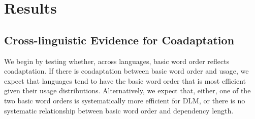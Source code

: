 \documentclass[11pt,a4paper]{article}
\newcommand\mhahn[1]{{\color{red}(#1)}}
\begin{document}
















\section*{Results}

\subsection*{Cross-linguistic Evidence for Coadaptation}

We begin by testing whether, across languages, basic word order reflects coadaptation.
If there is coadaptation between basic word order and usage, we expect that languages tend to have the basic word order that is most efficient given their usage distributions.
Alternatively, we expect that, either, one of the two basic word orders is systematically more efficient for DLM, or there is no systematic relationship between basic word order and dependency length.
\end{document}
